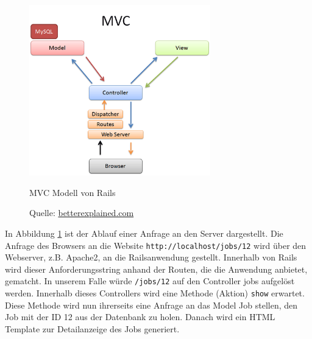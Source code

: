  \begin{figure}[h]
  \centering
  \includegraphics[width=0.7\textwidth]{./material/mvc-rails.png}
  \caption{MVC Modell von Rails}
  \caption*{Quelle: \href{http://betterexplained.com/articles/intermediate-rails-understanding-models-views-and-controllers/}{betterexplained.com}}
 \label{fig:mvcrails}
\end{figure}
In Abbildung \ref{fig:mvcrails} ist der Ablauf einer Anfrage an den Server dargestellt. Die Anfrage des Browsers an die Website \texttt{http://localhost/jobs/12} wird über den Webserver, z.B. Apache2, an die Railsanwendung gestellt. Innerhalb von Rails wird dieser Anforderungsstring anhand der Routen, die die Anwendung anbietet, gematcht. In unserem Falle würde \texttt{/jobs/12} auf den Controller jobs aufgelöst werden. Innerhalb dieses Controllers wird eine Methode (Aktion) \texttt{show} erwartet.
Diese Methode wird nun ihrerseits eine Anfrage an das Model Job stellen, den Job mit der ID 12 aus der Datenbank zu holen. Danach wird ein HTML Template zur Detailanzeige des Jobs generiert.


